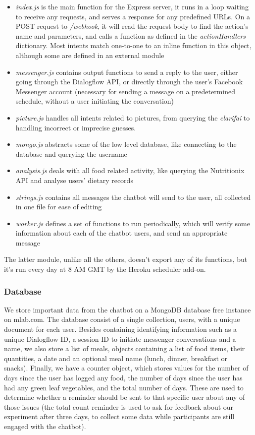 \begin{itemize}
  \item \textit{index.js} is the main function for the Express server, it runs in a loop waiting to receive any requests, and serves a response for any predefined URLs. On a POST request to \textit{/webhook}, it will read the request body to find the action's name and parameters, and calls a function as defined in the \textit{actionHandlers} dictionary. Most intents match one-to-one to an inline function in this object, although some are defined in an external module
  \item \textit{messenger.js} contains output functions to send a reply to the user, either going through the Dialogflow API, or directly through the user's Facebook Messenger account (necessary for sending a message on a predetermined schedule, without a user initiating the conversation)
  \item \textit{picture.js} handles all intents related to pictures, from querying the \textit{clarifai} to handling incorrect or imprecise guesses.
  \item \textit{mongo.js} abstracts some of the low level database, like connecting to the database and querying the username
  \item \textit{analysis.js} deals with all food related activity, like querying the Nutritionix API and analyse users' dietary records
  \item \textit{strings.js} contains all messages the chatbot will send to the user, all collected in one file for ease of editing
  \item \textit{worker.js} defines a set of functions to run periodically, which will verify some information about each of the chatbot users, and send an appropriate message
\end{itemize}
The latter module, unlike all the others, doesn't export any of its functions, but it's run every day at 8 AM GMT by the Heroku scheduler add-on.
\subsubsection{Database}
We store important data from the chatbot on a MongoDB database free instance on mlab.com. The database consist of a single collection, users, with a unique document for each user. Besides containing identifying information such as a unique Dialogflow ID, a session ID to initiate messenger conversations and a name, we also store a list of meals, objects containing a list of food items, their quantities, a date and an optional meal name (lunch, dinner, breakfast or snacks). Finally, we have a counter object, which stores values for the number of days since the user has logged any food, the number of days since the user has had any green leaf vegetables, and the total number of days. These are used to determine whether a reminder should be sent to that specific user about any of those issues (the total count reminder is used to ask for feedback about our experiment after three days, to collect some data while participants are still engaged with the chatbot).
